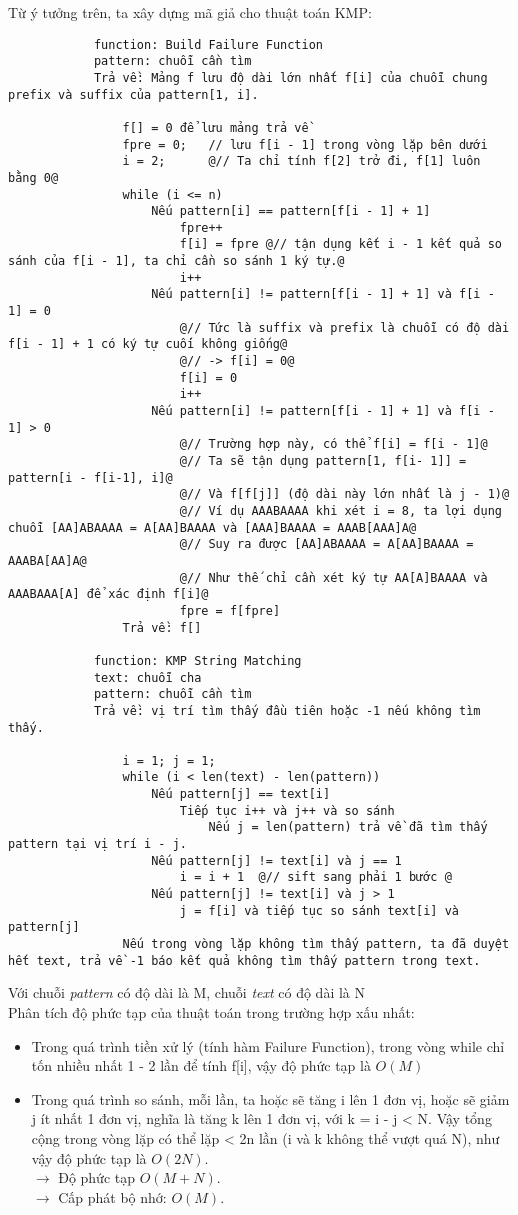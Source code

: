 \documentclass[a4paper,11pt]{article}
\begin{document}
			Từ ý tưởng trên, ta xây dựng mã giả cho thuật toán KMP:

			\begin{lstlisting}
			function: Build Failure Function
			pattern: chuỗi cần tìm 
			Trả về: Mảng f lưu độ dài lớn nhất f[i] của chuỗi chung prefix và suffix của pattern[1, i].

				f[] = 0 để lưu mảng trả về
				fpre = 0;   // lưu f[i - 1] trong vòng lặp bên dưới
				i = 2;		@// Ta chỉ tính f[2] trở đi, f[1] luôn bằng 0@
				while (i <= n)		
					Nếu pattern[i] == pattern[f[i - 1] + 1]
						fpre++
						f[i] = fpre	@// tận dụng kết i - 1 kết quả so sánh của f[i - 1], ta chỉ cần so sánh 1 ký tự.@
						i++
					Nếu pattern[i] != pattern[f[i - 1] + 1] và f[i - 1] = 0
						@// Tức là suffix và prefix là chuỗi có độ dài f[i - 1] + 1 có ký tự cuối không giống@
						@// -> f[i] = 0@
						f[i] = 0
						i++
					Nếu pattern[i] != pattern[f[i - 1] + 1] và f[i - 1] > 0
						@// Trường hợp này, có thể f[i] = f[i - 1]@
						@// Ta sẽ tận dụng pattern[1, f[i- 1]] = pattern[i - f[i-1], i]@
						@// Và f[f[j]] (độ dài này lớn nhất là j - 1)@
						@// Ví dụ AAABAAAA khi xét i = 8, ta lợi dụng chuỗi [AA]ABAAAA = A[AA]BAAAA và [AAA]BAAAA = AAAB[AAA]A@
						@// Suy ra được [AA]ABAAAA = A[AA]BAAAA = AAABA[AA]A@
						@// Như thế chỉ cần xét ký tự AA[A]BAAAA và AAABAAA[A] để xác định f[i]@
						fpre = f[fpre]
				Trả về: f[]

			function: KMP String Matching
			text: chuỗi cha 
			pattern: chuỗi cần tìm 
			Trả về: vị trí tìm thấy đầu tiên hoặc -1 nếu không tìm thấy.

				i = 1; j = 1; 
				while (i < len(text) - len(pattern))
					Nếu pattern[j] == text[i]
						Tiếp tục i++ và j++ và so sánh
							Nếu j = len(pattern) trả về đã tìm thấy pattern tại vị trí i - j.
					Nếu pattern[j] != text[i] và j == 1
						i = i + 1  @// sift sang phải 1 bước @
					Nếu pattern[j] != text[i] và j > 1
						j = f[i] và tiếp tục so sánh text[i] và pattern[j] 
				Nếu trong vòng lặp không tìm thấy pattern, ta đã duyệt hết text, trả về -1 báo kết quả không tìm thấy pattern trong text.
					\end{lstlisting}
			
			Với chuỗi \textit{pattern} có độ dài là M, chuỗi \textit{text} có độ dài là N \\
			Phân tích độ phức tạp của thuật toán trong trường hợp xấu nhất:
			\begin{itemize}
				\item Trong quá trình tiền xử lý (tính hàm Failure Function), trong vòng while chỉ tốn nhiều nhất 1 - 2 lần để tính f[i], vậy độ 
				phức tạp là $O(M)$
				\item Trong quá trình so sánh, mỗi lần, ta hoặc sẽ tăng i lên 1 đơn vị, hoặc sẽ giảm j ít nhất 1 đơn vị, nghĩa là tăng k lên 1 đơn vị, với k = i - j < N.
				Vậy tổng cộng trong vòng lặp có thể lặp < 2n lần (i và k không thể vượt quá N), như vậy độ phức tạp là $O(2N)$.\\
				$\to$ Độ phức tạp $O(M + N)$.\\
				$\to$ Cấp phát bộ nhớ: $O(M)$.
			\end{itemize}
\end{document}
